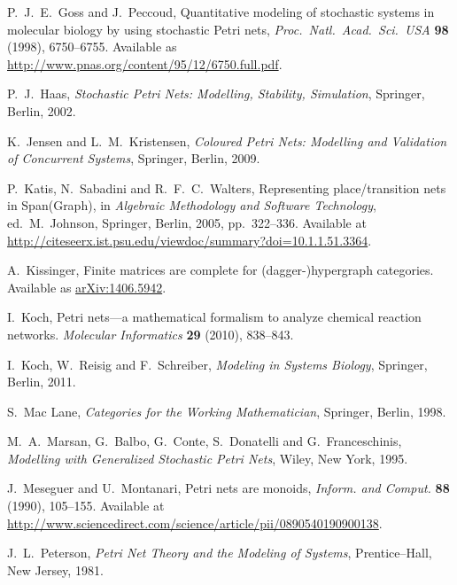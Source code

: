 \documentclass{compositionalityarticle}
\theoremstyle{plain}
\theoremstyle{remark}
\begin{document}
\begin{thebibliography}{9}
 P.\ J.\ E.\ Goss and J.\ Peccoud, Quantitative modeling of stochastic systems in molecular biology by using stochastic Petri nets, \textsl{Proc.\ Natl.\ Acad.\ Sci.\ USA} \textbf{98} (1998), 6750--6755.  Available as \href{http://www.pnas.org/content/95/12/6750.full.pdf}{http://www.pnas.org/content/95/12/6750.full.pdf}.

 P.\ J.\ Haas, \textsl{Stochastic Petri Nets: Modelling, Stability, Simulation}, Springer, Berlin, 2002.

 K.\ Jensen and L.\ M.\ Kristensen, \textsl{Coloured Petri Nets: Modelling and Validation of Concurrent Systems}, Springer, Berlin, 2009.

 P.\ Katis, N.\ Sabadini and R.\ F.\ C.\ Walters, Representing place/transition nets in Span(Graph), in \textsl{Algebraic Methodology and Software Technology}, ed.\ M.\ Johnson, Springer, Berlin, 2005, pp.\ 322--336.  Available at \href{http://citeseerx.ist.psu.edu/viewdoc/summary?doi=10.1.1.51.3364}{http://citeseerx.ist.psu.edu/viewdoc/summary?doi=10.1.1.51.3364}.

 A.\ Kissinger, Finite matrices are complete for (dagger-)hypergraph categories.  Available as \href{http://arxiv.org/abs/1406.5942}{arXiv:1406.5942}.

 I.\ Koch, Petri nets---a mathematical formalism to analyze 
chemical reaction networks. \textsl{Molecular Informatics} \textbf{29} (2010),
838--843.

 I.\ Koch, W.\ Reisig and F.\ Schreiber, \textsl{Modeling
in Systems Biology}, Springer, Berlin, 2011.

 S.\ Mac Lane, \textsl{Categories for the Working Mathematician},
Springer, Berlin, 1998.

M.\ A.\ Marsan, G.\ Balbo, G.\ Conte, S.\ Donatelli and G.\ Franceschinis,
\textsl{Modelling with Generalized Stochastic Petri Nets}, Wiley, New York, 1995.

 J.\ Meseguer and U.\ Montanari, Petri nets are monoids, \textsl{Inform. and Comput.} \textbf{88} (1990), 105--155. Available at \href{http://www.sciencedirect.com/science/article/pii/0890540190900138}{http://www.sciencedirect.com/science/article/pii/0890540190900138}.

J.\ L.\ Peterson, \textit{Petri Net Theory and the Modeling of Systems}, 
Prentice--Hall, New Jersey, 1981.  


\end{thebibliography}
\end{document}
